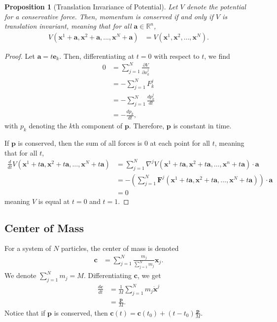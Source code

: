 \documentclass[10pt]{extarticle}
\newcommand{\R}{\mathbb{R}}
\theoremstyle{plain}
\newtheorem*{proposition}{Proposition}%
\theoremstyle{definition}
\theoremstyle{remark}
\renewcommand{\newline}{\hfill\break}
\begin{document}
  \begin{proposition}[Translation Invariance of Potential]
  Let $V$ denote the potential for a conservative force. Then, momentum is conserved if and only if $V$ is translation invariant, meaning that for all $\mathbf{a}\in \R^n$,
  \begin{align*}
    V(\mathbf{x}^1 + \mathbf{a},\mathbf{x}^2 + \mathbf{a},\dots,\mathbf{x}^N+\mathbf{a}) &= V(\mathbf{x}^1,\mathbf{x}^2,\dots,\mathbf{x}^N).
  \end{align*}
  \end{proposition}
  \begin{proof}
  Let $\mathbf{a} = t\mathbf{e}_k$. Then, differentiating at $t=0$ with respect to $t$, we find
      \begin{align*}
        0 &= \sum_{j=1}^{N}\frac{\partial V}{\partial x_{k}^j}\\
          &= -\sum_{j=1}^{N}F^{j}_k\\
          &= -\sum_{j=1}^{N}\frac{dp_{k}^j}{dt}\\
          &= -\frac{dp_k}{dt},
      \end{align*}
      with $p_k$ denoting the $k$th component of $\mathbf{p}$. Therefore, $\mathbf{p}$ is constant in time.\newline

      If $\mathbf{p}$ is conserved, then the sum of all forces is $0$ at each point for all $t$, meaning that for all $t$,
      \begin{align*}
        \frac{d}{dt}V(\mathbf{x}^1 + t\mathbf{a} , \mathbf{x}^2 + t\mathbf{a},\dots,\mathbf{x}^N + t\mathbf{a}) &= \sum_{j=1}^{N}\nabla^jV(\mathbf{x}^1 + t\mathbf{a},\mathbf{x}^2 + t\mathbf{a},\dots,\mathbf{x}^n + t\mathbf{a})\cdot \mathbf{a}\\
                                                                                              &= -\left(\sum_{j=1}^{N}\mathbf{F}^j(\mathbf{x}^1 + t\mathbf{a}, \mathbf{x}^2 + t\mathbf{a},\dots,\mathbf{x}^N + t\mathbf{a})\right)\cdot \mathbf{a}\\
                                                                                              &= 0
      \end{align*}
      meaning $V$ is equal at $t=0$ and $t=1$.
  \end{proof}
  \subsection{Center of Mass}%
  For a system of $N$ particles, the center of mass is denoted
  \begin{align*}
    \mathbf{c} &= \sum_{j=1}^{N}\frac{m_j}{\sum_{j=1}^{N}m_j}\mathbf{x}_j.
  \end{align*}
  We denote $\sum_{j=1}^{N}m_j = M$. Differentiating $\mathbf{c}$, we get
  \begin{align*}
    \frac{d\mathbf{c}}{dt} &= \frac{1}{M}\sum_{j=1}^{N}m_j\mathbf{\dot{x}}^j\\
                        &= \frac{\mathbf{p}}{M}.
  \end{align*}
  Notice that if $ \mathbf{p} $ is conserved, then $ \mathbf{c}(t) = \mathbf{c}(t_0) + (t-t_0)\frac{ \mathbf{p} }{M}$.\newline
\end{document}
